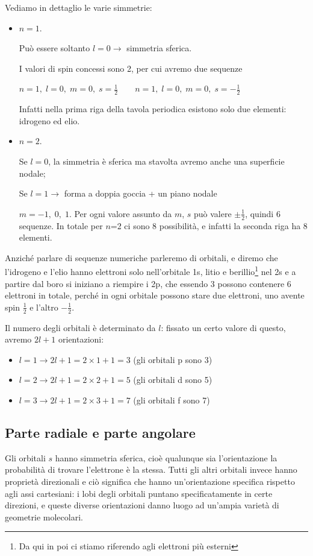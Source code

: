 \vspace{0.2cm}Vediamo in dettaglio le varie simmetrie:
\begin{itemize}
  \item $n=1$.
  
  Può essere soltanto $l=0 \rightarrow$ simmetria sferica.
  
  I valori di spin concessi sono 2, per cui avremo due sequenze

$n=1, \; l=0, \; m=0, \; s=\frac{1}{2} \qquad n=1, \; l=0, \; m=0, \; s=-\frac{1}{2}$

Infatti nella prima riga della tavola periodica esistono solo due elementi: idrogeno ed elio.
\item $n=2$.

Se $l=0$, la simmetria è sferica ma stavolta avremo anche una superficie nodale;

Se $l=1 \rightarrow$ forma a doppia goccia + un piano nodale

$m=-1, \; 0,\; 1$. Per ogni valore assunto da $m$, $s$ può valere $\pm\frac{1}{2}$, quindi 6 sequenze.
In totale per $n$=2 ci sono 8 possibilità, e infatti la seconda riga ha 8 elementi.
\end{itemize}
Anziché parlare di sequenze numeriche parleremo di orbitali, e diremo che l'idrogeno e l'elio hanno elettroni solo nell'orbitale 1s, litio e berillio\footnote{Da qui in poi ci stiamo riferendo agli elettroni più esterni} nel 2s e a partire dal boro si iniziano a riempire i 2p, che essendo 3 possono contenere 6 elettroni in totale, perché in ogni orbitale possono stare due elettroni, uno avente spin $\frac{1}{2}$ e l'altro $-\frac{1}{2}$.

Il numero degli orbitali è determinato da $l$: fissato un certo valore di questo, avremo $2l+1$ orientazioni:
\begin{itemize}
  \item $l=1 \rightarrow 2l+1=2\times1 + 1=3$ (gli orbitali p sono 3)
  \item $l=2 \rightarrow 2l+1=2\times2 + 1=5$ (gli orbitali d sono 5)
  \item $l=3 \rightarrow 2l+1=2\times3 + 1=7$ (gli orbitali f sono 7)
\end{itemize}
\subsection{Parte radiale e parte angolare}
Gli orbitali $s$ hanno simmetria sferica, cioè qualunque sia l'orientazione la probabilità di trovare l'elettrone è la stessa. Tutti gli altri orbitali invece hanno proprietà direzionali e ciò significa che hanno un'orientazione specifica rispetto agli assi cartesiani: i lobi degli orbitali puntano specificatamente in certe direzioni, e queste diverse orientazioni danno luogo ad un'ampia varietà di geometrie molecolari.

